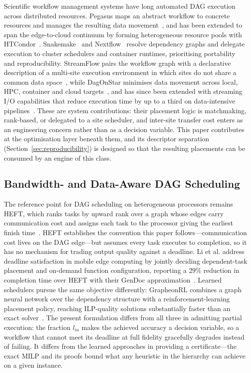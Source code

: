 Scientific workflow management systems have long automated DAG execution across distributed
resources. Pegasus maps an abstract workflow to concrete resources and manages the resulting data
movement~\cite{deelman2015pegasus}, and has been extended to span the edge-to-cloud continuum by
forming heterogeneous resource pools with HTCondor~\cite{tanaka2022pegasusedge}.
Snakemake~\cite{koster2012snakemake} and Nextflow~\cite{ditommaso2017nextflow} resolve dependency
graphs and delegate execution to cluster schedulers and container runtimes, prioritising
portability and reproducibility. StreamFlow pairs the workflow graph with a declarative description
of a multi-site execution environment in which sites do not share a common data
space~\cite{colonnelli2021streamflow}, while DagOnStar minimises data movement across local, HPC,
container and cloud targets~\cite{sanchezgallegos2021dagonstar}, and has since been extended with
streaming I/O capabilities that reduce execution time by up to a third on data-intensive
pipelines~\cite{perrotta2025streaming}. These are system contributions: their placement logic is
matchmaking, rank-based, or delegated to a site scheduler, and inter-site transfer cost enters as
an engineering concern rather than as a decision variable. This paper contributes at the
optimisation layer beneath them, and its descriptor separation
(Section~\ref{sec:reproducibility}) is designed so that the resulting placements can be consumed by
an engine of this class.

\subsection{Bandwidth- and Data-Aware DAG Scheduling}
\label{subsec:rw_dag}

The reference point for DAG scheduling on heterogeneous processors remains HEFT, which ranks tasks
by upward rank over a graph whose edges carry communication cost and assigns each task to the
processor giving the earliest finish time~\cite{topcuoglu2002heft}. HEFT establishes the convention
this paper follows---communication cost lives on the DAG edge---but assumes every task executes to
completion, so it has no mechanism for trading output quality against a deadline. Li et al. address
deadline satisfaction in mobile edge computing by jointly deciding dependent-task placement and
on-demand function configuration, reporting a 29\% reduction in completion time over HEFT with
their GenDoc approximation~\cite{li2023dagmec}. Learned schedulers pursue the same objective
differently: GrapheonRL combines a graph neural network over the dependency structure with a
reinforcement-learning placement policy, reaching ILP-quality solutions substantially faster than
an exact solver~\cite{sharma2025grapheonrl}. The present formulation differs from all three in
admitting partial execution: the fraction $l_{ia}$ makes the achieved accuracy a decision variable, so
a workflow that cannot meet its deadline at full fidelity gracefully degrades instead of failing.
It differs from the learned approaches in providing a certificate---the exact MILP and its proofs
bound what any heuristic in the hierarchy can achieve on a given instance.

